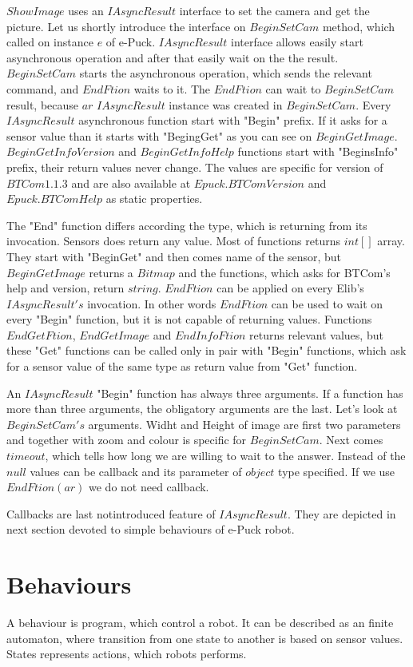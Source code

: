 	$ShowImage$ uses an $IAsyncResult$ interface to set the camera and get the picture.
	Let us shortly introduce the interface on $BeginSetCam$ method, which called on instance $e$ of e-Puck.
	$IAsyncResult$ interface allows easily start asynchronous operation and after that easily wait on the the result.
	$BeginSetCam$ starts the asynchronous operation, which sends the relevant command, and $EndFtion$ waits to it.
	The $EndFtion$ can wait to $BeginSetCam$ result, because $ar$ $IAsyncResult$ instance was created in $BeginSetCam$.
	Every $IAsyncResult$ asynchronous function start with "Begin" prefix. 
	If it asks for a sensor value than it starts with "BegingGet" as you can see on $BeginGetImage$.
	$BeginGetInfoVersion$ and $BeginGetInfoHelp$ functions start with "BeginsInfo" prefix, their return values never change. The values are specific for version of $BTCom 1.1.3$ and
	are also available at $Epuck.BTComVersion$ and $Epuck.BTComHelp$ as static properties.

	The "End" function differs according the type, which is returning from its invocation.
	Sensors does return any value. Most of functions returns $int[]$ array. They start with "BeginGet" and then comes name of the sensor, 
	but $BeginGetImage$ returns a $Bitmap$ and the functions, which asks for BTCom's help and version,
	return $string$.
	$EndFtion$ can be applied on every Elib's $IAsyncResult's$ invocation. In other words $EndFtion$ can be used to wait on every "Begin" function, but
	it is not capable of returning values. Functions $EndGetFtion$, $EndGetImage$ and $EndInfoFtion$ returns relevant values, but
	these "Get" functions can be called only in pair with "Begin" functions, which ask for a sensor value of the same type as return value from "Get" function.

	An $IAsyncResult$ "Begin" function has always three arguments. If a function has more than three arguments, the obligatory arguments are the last.
	Let's look at $BeginSetCam's$ arguments. Widht and Height of image are first two parameters and together with zoom and colour is specific for $BeginSetCam$.
	Next comes $timeout$, which tells how long we are willing to wait to the answer. Instead of the $null$ values can be callback and its parameter of $object$ type specified.
	If we use $EndFtion(ar)$ we do not need callback.

	Callbacks are last notintroduced feature of $IAsyncResult$. They are depicted in next section devoted to simple behaviours of e-Puck robot.
\section{Behaviours} \label{behaviours}
	A behaviour is program, which control a robot. It can be described as an finite automaton, where transition from one state to another is based on sensor values.
	States represents actions, which robots performs.
	
